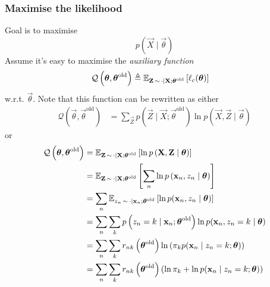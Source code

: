 \subsubsection{Maximise the likelihood}
Goal is to maximise 
$$p(\vec X \mid \vec \theta)$$
Assume it's easy to maximise the \emph{auxiliary function}
\begin{align}
    \mathcal Q\left(\boldsymbol{\mathbf{\theta}}, \boldsymbol{\mathbf{\theta}}^{\text{old}}\right)    &\triangleq \operatorname{\mathbb{E}}_{\boldsymbol{\mathbf{Z}} \,\sim \,\cdot \mid \boldsymbol{\mathbf{X}}; \boldsymbol{\mathbf{\theta}}^{\text{old}}} \left[\ell_c(\boldsymbol{\mathbf{\theta}})\right]
\end{align}
w.r.t. $\vec \theta$. Note that this function can be rewritten as either
\begin{align}
    \mathcal Q\left(\vec \theta, \vec \theta^{\text{old}}\right)    &= \sum_{\vec Z} p\left(\vec Z \mid \vec X; \vec \theta^{\text{old}}\right) \ln p\left(\vec X, \vec Z \mid \vec \theta\right)
\end{align}
or
\begin{align}
    \mathcal Q\left(\boldsymbol{\mathbf{\theta}}, \boldsymbol{\mathbf{\theta}}^{\text{old}}\right)    &= \operatorname{\mathbb{E}}_{\boldsymbol{\mathbf{Z}} \,\sim \,\cdot \mid \boldsymbol{\mathbf{X}}; \boldsymbol{\mathbf{\theta}}^{\text{old}}} \left[\ln p\left(\boldsymbol{\mathbf{X}}, \boldsymbol{\mathbf{Z}} \mid \boldsymbol{\mathbf{\theta}}\right)\right] \\
                                                                    &= \operatorname{\mathbb{E}}_{\boldsymbol{\mathbf{Z}} \,\sim \,\cdot \mid \boldsymbol{\mathbf{X}}; \boldsymbol{\mathbf{\theta}}^{\text{old}}} \left[\sum_n \ln p\left(\boldsymbol{\mathbf{x}}_n, z_n \mid \boldsymbol{\mathbf{\theta}}\right)\right] \\
                                                                    &= \sum_n \operatorname{\mathbb{E}}_{z_n \,\sim \,\cdot \mid \boldsymbol{\mathbf{x}}_n; \boldsymbol{\mathbf{\theta}}^{\text{old}}} \left[\ln p(\boldsymbol{\mathbf{x}}_n, z_n \mid \boldsymbol{\mathbf{\theta}})\right] \\
                                                                    &= \sum_n \sum_k p\left(z_n = k \mid \boldsymbol{\mathbf{x}}_n; \boldsymbol{\mathbf{\theta}}^{\text{old}}\right) \ln p(\boldsymbol{\mathbf{x}}_n, z_n = k \mid \boldsymbol{\mathbf{\theta}}) \\
                                                                    &= \sum_n \sum_k r_{nk}\left(\boldsymbol{\mathbf{\theta}}^{\text{old}}\right) \ln \left(\pi_k p(\boldsymbol{\mathbf{x}}_n \mid z_n = k; \boldsymbol{\mathbf{\theta}})\right) \\
                                                                    &= \sum_n \sum_k r_{nk}\left(\boldsymbol{\mathbf{\theta}}^{\text{old}}\right) \left(\ln \pi_k + \ln p(\boldsymbol{\mathbf{x}}_n \mid z_n = k; \boldsymbol{\mathbf{\theta}})\right)
\end{align}

